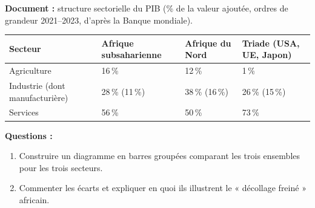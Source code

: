 \documentclass[11pt]{article}
\begin{document}
\begin{exoresolu}
\textbf{Document :} structure sectorielle du PIB (\% de la valeur ajoutée, ordres de grandeur 2021--2023, d'après la Banque mondiale).

\begin{center}
\begin{tabularx}{\linewidth}{|l|X|X|X|}\hline
\rowcolor{popblueL}\textbf{Secteur} & \textbf{Afrique subsaharienne} & \textbf{Afrique du Nord} & \textbf{Triade (USA, UE, Japon)} \\ \hline
Agriculture & 16\,\% & 12\,\% & 1\,\% \\ \hline
Industrie (dont manufacturière) & 28\,\% (11\,\%) & 38\,\% (16\,\%) & 26\,\% (15\,\%) \\ \hline
Services & 56\,\% & 50\,\% & 73\,\% \\ \hline
\end{tabularx}
\end{center}

\textbf{Questions :}
\begin{enumerate}
    \item Construire un diagramme en barres groupées comparant les trois ensembles pour les trois secteurs.
    \item Commenter les écarts et expliquer en quoi ils illustrent le « décollage freiné » africain.
\end{enumerate}


\end{exoresolu}
\end{document}

